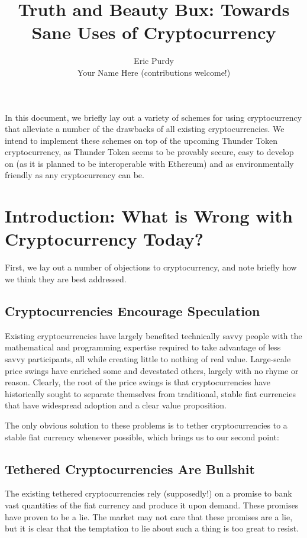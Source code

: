 \documentclass{article}
\title{Truth and Beauty Bux: Towards Sane Uses of Cryptocurrency}
\author{Eric Purdy \\ Your Name Here (contributions welcome!)}
\begin{document}
\maketitle

In this document, we briefly lay out a variety of schemes for using
cryptocurrency that alleviate a number of the drawbacks of all
existing cryptocurrencies. We intend to implement these schemes on top
of the upcoming Thunder Token cryptocurrency, as Thunder Token seems
to be provably secure, easy to develop on (as it is planned to be
interoperable with Ethereum) and as environmentally friendly as any
cryptocurrency can be.

\section{Introduction: What is Wrong with Cryptocurrency Today?}

First, we lay out a number of objections to cryptocurrency, and note
briefly how we think they are best addressed.

\subsection{Cryptocurrencies Encourage Speculation}

Existing cryptocurrencies have largely benefited technically savvy
people with the mathematical and programming expertise required to
take advantage of less savvy participants, all while creating little
to nothing of real value. Large-scale price swings have enriched some
and devestated others, largely with no rhyme or reason. Clearly, the
root of the price swings is that cryptocurrencies have historically
sought to separate themselves from traditional, stable fiat currencies
that have widespread adoption and a clear value proposition.

The only obvious solution to these problems is to tether
cryptocurrencies to a stable fiat currency whenever possible, which
brings us to our second point:

\subsection{Tethered Cryptocurrencies Are Bullshit}

The existing tethered cryptocurrencies rely (supposedly!) on a promise
to bank vast quantities of the fiat currency and produce it upon
demand. These promises have proven to be a lie. The market may not
care that these promises are a lie, but it is clear that the
temptation to lie about such a thing is too great to resist.
\end{document}
